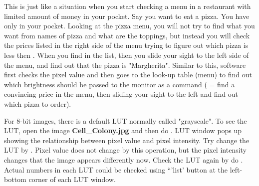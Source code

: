 This is just like a situation when you start checking a menu in a
restaurant with limited amount of money in your pocket. Say you want to
eat a pizza. You have only  in your pocket. Looking at the
pizza menu, you will not try to find what you want from names of pizza
and what are the toppings, but instead you will check the prices listed
in the right side of the menu trying to figure out which pizza is less
then . When you find  in the list, then you slide your
sight to the left side of the menu, and find out that the pizza is
"Margherita". Similar to this,
software first checks the pixel value and then goes to the look-up
table (menu) to find out which brightness should be passed to the
monitor as a command ( = find a convincing price in the menu, then
sliding your sight to the left and find out which pizza to order).



\begin{indentexercise}{1}
For 8-bit images, there is a default LUT normally called "grayscale". 
To see the LUT, open the image \textbf{Cell\_Colony.jpg} and then 
do . LUT window pops up showing 
the relationship between pixel value and pixel intensity. 
Try change the LUT by . 
Pixel value does not change by this operation, but the pixel intensity changes 
that the image appears differently now. Check the LUT again by do . 
Actual numbers in each LUT could be checked using ``'list' button at the left-bottom corner of each LUT window. 
\end{indentexercise}

